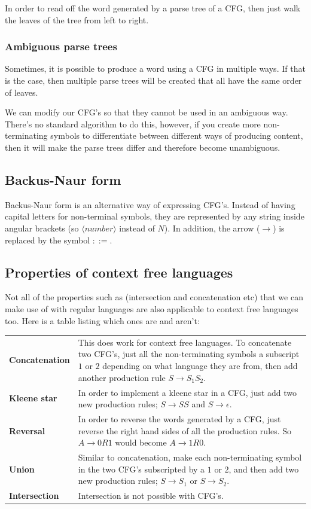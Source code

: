 In order to read off the word generated by a parse tree of a CFG, then just walk
the leaves of the tree from left to right.

\subsubsection{Ambiguous parse trees}

Sometimes, it is possible to produce a word using a CFG in multiple ways. If
that is the case, then multiple parse trees will be created that all have the
same order of leaves.

We can modify our CFG's so that they cannot be used in an ambiguous way. There's
no standard algorithm to do this, however, if you create more non-terminating
symbols to differentiate between different ways of producing content, then it
will make the parse trees differ and therefore become unambiguous.


\subsection{Backus-Naur form}

Backus-Naur form is an alternative way of expressing CFG's. Instead of having
capital letters for non-terminal symbols, they are represented by any string
inside angular brackets (so $\langle number \rangle$ instead of $N$). In
addition, the arrow ($\rightarrow$) is replaced by the symbol $::=$.

\subsection{Properties of context free languages}

Not all of the properties such as (intersection and concatenation etc) that we
can make use of with regular languages are also applicable to context free
languages too. Here is a table listing which ones are and aren't:

\begin{tabularx}{\textwidth}{>{\bfseries}l|X}
	Concatenation & This does work for context free languages. To concatenate
					two CFG's, just all the non-terminating symbols a
					subscript $1$ or $2$ depending on what language they are
					from, then add another production rule 
					$S \rightarrow S_1S_2$.\\
	Kleene star   & In order to implement a kleene star in a CFG, just add two
					new production rules; $S \rightarrow SS$ and $S \rightarrow
					\epsilon$.\\
	Reversal      & In order to reverse the words generated by a CFG, just 
					reverse the right hand sides of all the production rules. 
					So $A \rightarrow 0R1$ would become $A \rightarrow 1R0$.\\
	Union         & Similar to concatenation, make each non-terminating symbol
					in the two CFG's subscripted by a $1$ or $2$, and then add
					two new production rules; $S \rightarrow S_1$ or
					$S \rightarrow S_2$.\\
	Intersection  & Intersection is not possible with CFG's.
\end{tabularx}
